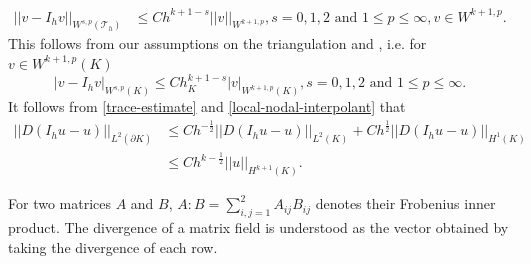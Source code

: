 \documentclass[12pt]{amsart}
\numberwithin{equation}{section}
\begin{document}
\begin{align} \label{nodal-interpolant}
||v-I_h v||_{W^{s,p}(\mathcal{T}_h)} & \leq C h^{k+1-s} ||v||_{W^{k+1,p}}, s=0, 1, 2 \text{ and } 1\leq p \leq \infty, v \in W^{k+1,p}.
\end{align}
This follows from our assumptions on the triangulation and \cite[ (4.4.5) ]{Brenner08}, i.e. for $ v \in W^{k+1,p}(K)$
\begin{equation} \label{local-nodal-interpolant}
|v-I_h v|_{W^{s,p}(K)}  \leq C h^{k+1-s}_K |v|_{W^{k+1,p}(K)}, s=0, 1, 2 \text{ and } 1\leq p \leq \infty.
\end{equation}
It follows from \eqref{trace-estimate} and \eqref{local-nodal-interpolant} that 
\begin{equation} \label{bramble}
\begin{split}
|| D( I_h u - u) ||_{L^{2}(\partial K)} & \leq C h^{- \frac{1}{2} }  || D( I_h u - u) ||_{L^{2}(K)} + C h^{  \frac{1}{2} }  || D(I_h u - u) ||_{H^{1}(K)} \\
& \leq C h^{k- \frac{1}{2}} || u ||_{H^{k+1}(K)}. 
\end{split}
\end{equation}


For two matrices $A$ and $B$, $A:B = \sum^2_{i,j=1}A_{ij}B_{ij}$ denotes their Frobenius inner product.
The divergence of a matrix field is understood as the vector obtained by taking the divergence of each row. 
\end{document}
